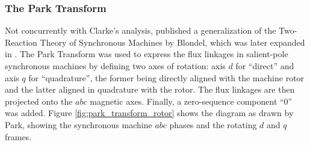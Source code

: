 \subsubsection{The Park Transform} %

	Not concurrently with Clarke's analysis, \cite{Park1929} published a generalization of the Two-Reaction Theory of Synchronous Machines by Blondel, which was later expanded in \cite{Doherty1926}. The Park Transform was used to express the flux linkages in salient-pole synchronous machines by defining two axes of rotation: axis $d$ for ``direct'' and axis $q$ for ``quadrature'', the former being directly aligned with the machine rotor and the latter aligned in quadrature with the rotor. The flux linkages are then projected onto the $abc$ magnetic axes. Finally, a zero-sequence component ``$0$'' was added. Figure \ref{fig:park_transform_rotor} shows the diagram as drawn by Park, showing the synchronous machine $abc$ phases and the rotating $d$ and $q$ frames.



